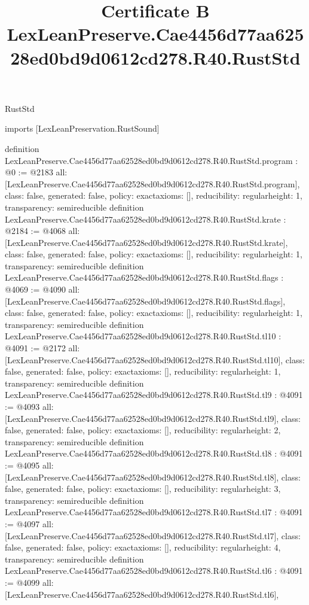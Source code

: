 \begin{lexlean}{RustStd}
\title{Certificate B LexLeanPreserve.Cae4456d77aa62528ed0bd9d0612cd278.R40.RustStd}
\begin{coremodule}
imports [LexLeanPreservation.RustSound]

definition LexLeanPreserve.Cae4456d77aa62528ed0bd9d0612cd278.R40.RustStd.program : @0 := @2183 {
  all: [LexLeanPreserve.Cae4456d77aa62528ed0bd9d0612cd278.R40.RustStd.program],
  class: false,
  generated: false,
  policy: exact{axioms: []},
  reducibility: regular{height: 1},
  transparency: semireducible
}
definition LexLeanPreserve.Cae4456d77aa62528ed0bd9d0612cd278.R40.RustStd.krate : @2184 := @4068 {
  all: [LexLeanPreserve.Cae4456d77aa62528ed0bd9d0612cd278.R40.RustStd.krate],
  class: false,
  generated: false,
  policy: exact{axioms: []},
  reducibility: regular{height: 1},
  transparency: semireducible
}
definition LexLeanPreserve.Cae4456d77aa62528ed0bd9d0612cd278.R40.RustStd.flags : @4069 := @4090 {
  all: [LexLeanPreserve.Cae4456d77aa62528ed0bd9d0612cd278.R40.RustStd.flags],
  class: false,
  generated: false,
  policy: exact{axioms: []},
  reducibility: regular{height: 1},
  transparency: semireducible
}
definition LexLeanPreserve.Cae4456d77aa62528ed0bd9d0612cd278.R40.RustStd.tl10 : @4091 := @2172 {
  all: [LexLeanPreserve.Cae4456d77aa62528ed0bd9d0612cd278.R40.RustStd.tl10],
  class: false,
  generated: false,
  policy: exact{axioms: []},
  reducibility: regular{height: 1},
  transparency: semireducible
}
definition LexLeanPreserve.Cae4456d77aa62528ed0bd9d0612cd278.R40.RustStd.tl9 : @4091 := @4093 {
  all: [LexLeanPreserve.Cae4456d77aa62528ed0bd9d0612cd278.R40.RustStd.tl9],
  class: false,
  generated: false,
  policy: exact{axioms: []},
  reducibility: regular{height: 2},
  transparency: semireducible
}
definition LexLeanPreserve.Cae4456d77aa62528ed0bd9d0612cd278.R40.RustStd.tl8 : @4091 := @4095 {
  all: [LexLeanPreserve.Cae4456d77aa62528ed0bd9d0612cd278.R40.RustStd.tl8],
  class: false,
  generated: false,
  policy: exact{axioms: []},
  reducibility: regular{height: 3},
  transparency: semireducible
}
definition LexLeanPreserve.Cae4456d77aa62528ed0bd9d0612cd278.R40.RustStd.tl7 : @4091 := @4097 {
  all: [LexLeanPreserve.Cae4456d77aa62528ed0bd9d0612cd278.R40.RustStd.tl7],
  class: false,
  generated: false,
  policy: exact{axioms: []},
  reducibility: regular{height: 4},
  transparency: semireducible
}
definition LexLeanPreserve.Cae4456d77aa62528ed0bd9d0612cd278.R40.RustStd.tl6 : @4091 := @4099 {
  all: [LexLeanPreserve.Cae4456d77aa62528ed0bd9d0612cd278.R40.RustStd.tl6],
}
\end{coremodule}
\end{lexlean}
